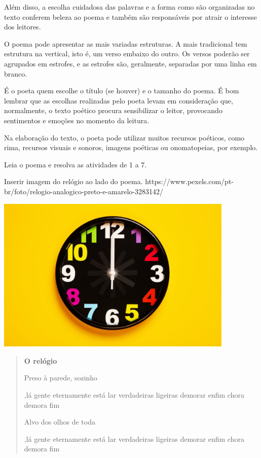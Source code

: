 \begin{boxlist}
{{Além disso, a escolha
cuidadosa das palavras e a forma como são organizadas no texto conferem
beleza ao poema e também são responsáveis por atrair o interesse dos
leitores.

O poema pode apresentar as mais variadas estruturas. A mais tradicional tem
estrutura na vertical, isto é, um verso embaixo do outro. Os versos
poderão ser agrupados em estrofes, e as estrofes são, geralmente,
separadas por uma linha em branco.

É o poeta quem escolhe o título (se houver) e o tamanho do poema. É bom lembrar que
as escolhas realizadas pelo
poeta levam em consideração que, normalmente, o texto poético procura
sensibilizar o leitor, provocando sentimentos e emoções no momento da
leitura.

Na elaboração do texto, o poeta pode utilizar muitos recursos poéticos,
como rima, recursos visuais e sonoros, imagens poéticas ou
onomatopeias, por exemplo.


Leia o poema e resolva as atividades de 1 a 7.

Inserir imagem do relógio ao lado do poema.
https://www.pexels.com/pt-br/foto/relogio-analogico-preto-e-amarelo-3283142/

\includegraphics[width=4.46875in,height=2.93485in]{media/image16.jpeg}

\begin{quote}
\textbf{O relógio}

Preso à parede, sozinho 

\coment,{lá
gente
eternamente
está
lar
verdadeiras
ligeiras
demorar
enfim
chora
demora
fim}

Alvo dos olhos de toda 

\coment,{lá
gente
eternamente
está
lar
verdadeiras
ligeiras
demorar
enfim
chora
demora
fim}


\end{quote}}}
\end{boxlist}
